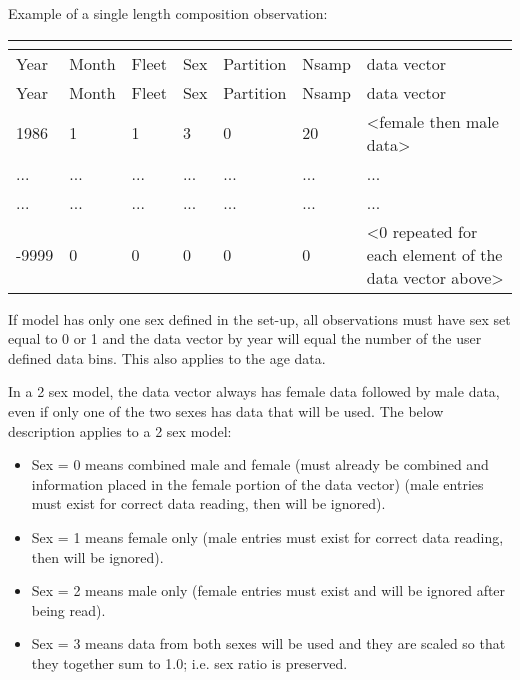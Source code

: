 Example of a single length composition observation:
\vspace*{-1cm} %
\begin{center}
	\vspace*{-\baselineskip}
	\vspace*{-\baselineskip}
	\begin{tabular}{p{1.5cm} p{1.5cm} p{1.5cm} p{1.5cm} p{1.5cm} p{1.5cm} p{5cm}}
		\multicolumn{7}{l}{} \\
		\hline
		Year & Month & Fleet & Sex & Partition & Nsamp & data vector \Tstrut\Bstrut\\
		Year & Month & Fleet & Sex & Partition & Nsamp & data vector \Tstrut\Bstrut\\
		\hline
		1986 & 1 & 1 & 3 & 0 & 20 & <female then male data> \Tstrut\\
		... & ... & ... & ... & ... & ... & ... \\
		... & ... & ... & ... & ... & ... & ... \\
-9999 & 0 & 0 & 0 & 0 & 0 & <0 repeated for each element of the data
vector above> \Bstrut\\
		\hline	
	\end{tabular}
\end{center}

If model has only one sex defined in the set-up, all observations must have sex set equal to 0 or 1 and the data vector by year will equal the number of the user defined data bins. This also applies to the age data. 

In a 2 sex model, the data vector always has female data followed by male data, even if only one of the two sexes has data that will be used. The below description applies to a 2 sex model:
	\begin{itemize}
		\item Sex = 0 means combined male and female (must already be combined and information placed in the female portion of the data vector) (male entries must exist for correct data reading, then will be ignored).
		\item Sex = 1 means female only (male entries must exist for correct data reading, then will be ignored).
		\item Sex = 2 means male only (female entries must exist and will be ignored after being read).
		\item Sex = 3 means data from both sexes will be used and they are scaled so that they together sum to 1.0; i.e. sex ratio is preserved.
	\end{itemize}

